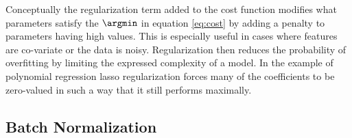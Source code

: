Conceptually the regularization term added to the cost function modifies what parameters satisfy the $\argmin$ in equation \ref{eq:cost} by adding a penalty to parameters having high values. This is especially useful in cases where features are co-variate or the data is noisy. 
Regularization then reduces the probability of overfitting by limiting the expressed complexity of a model. In the example of polynomial regression lasso regularization forces many of the coefficients to be zero-valued in such a way that it still performs maximally.  


\subsection{Batch Normalization}\label{sec:batchnorm}
